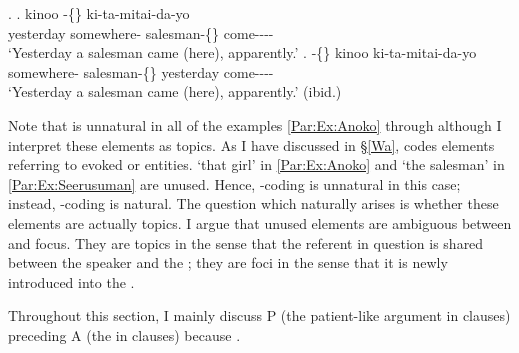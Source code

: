 \ex.
 \ag. kinoo  -\{\} ki-ta-mitai-da-yo \\
      yesterday somewhere- salesman-\{\} come---- \\
      `Yesterday a salesman came (here), apparently.'
 \bg.  -\{\} kinoo ki-ta-mitai-da-yo \\
      somewhere- salesman-\{\} yesterday come---- \\
      `Yesterday a salesman came (here), apparently.'
      \hfill{(ibid.)}

Note that  is unnatural in all of the examples \ref{Par:Ex:Anoko} through \Last
although I interpret these elements as topics.
As I have discussed in \S \ref{Wa},
 codes elements referring to evoked or  entities.
 `that girl' in \ref{Par:Ex:Anoko} and  `the salesman' in \ref{Par:Ex:Seerusuman} are unused.
Hence, -coding is unnatural in this case;
instead, -coding is natural.
The question which naturally arises is whether these elements are actually topics.
I argue that unused elements are ambiguous between  and focus.
They are topics in the sense that the referent in question is shared between the speaker and the  ;
they are foci in the sense that it is newly introduced into the .

Throughout this section,
I mainly discuss P (the patient-like argument in  clauses) preceding A (the  in  clauses)
because .

